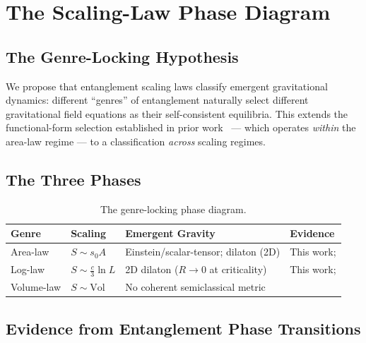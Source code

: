\documentclass[aps,prd,twocolumn,superscriptaddress,nofootinbib,floatfix]{revtex4-2}
\newcommand{\sn}{s_0}
\begin{document}
\section{The Scaling-Law Phase Diagram}
\label{sec:phasediagram}

\subsection{The Genre-Locking Hypothesis}

We propose that entanglement scaling laws classify emergent gravitational dynamics: different ``genres'' of entanglement naturally select different gravitational field equations as their self-consistent equilibria. This extends the functional-form selection established in prior work~\cite{Faulkner2014,Swingle2014,Haehl2018} --- which operates \emph{within} the area-law regime --- to a classification \emph{across} scaling regimes.

\subsection{The Three Phases}

\begin{table}[ht!]
\centering
\begin{tabular}{@{}p{1.5cm}p{1.2cm}p{2.2cm}p{2.0cm}@{}}
\toprule
Genre & Scaling & Emergent Gravity & Evidence \\
\midrule
Area-law & $S \sim \sn A$ & Einstein/scalar-tensor; dilaton (2D) & This work; \cite{Jacobson2016,Faulkner2014} \\
Log-law & $S \sim \frac{c}{3}\ln L$ & 2D dilaton ($R \to 0$ at criticality) & This work; \cite{CallebautVerlinde2018} \\
Volume-law & $S \sim \mathrm{Vol}$ & No coherent semiclassical metric & \cite{VasseurPotterYouLudwig2019,LiChenFisher2018,Pastawski2015} \\
\bottomrule
\end{tabular}
\caption{The genre-locking phase diagram.}
\label{tab:genres}
\end{table}

\subsection{Evidence from Entanglement Phase Transitions}
\end{document}
